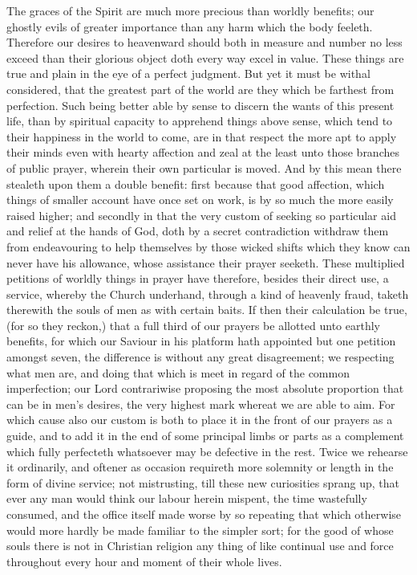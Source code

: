 The graces of the Spirit are much more precious than worldly benefits; our ghostly evils of greater importance than any harm which the body feeleth. Therefore our desires to heavenward should both in measure and number no less exceed than their glorious object doth every way excel in value. These things are true and plain in the eye of a perfect judgment. But yet it must be withal considered, that the greatest part of the world are they which be farthest from perfection. Such being better able by sense to discern the wants of this present life, than by spiritual capacity to apprehend things above sense, which tend to their happiness in the world to come, are in that respect the more apt to apply their minds even with hearty affection and zeal at the least unto those branches of public prayer, wherein their own particular is moved. And by this mean there stealeth upon them a double benefit: first because that good affection, which things of smaller account have once set on work, is by so much the more easily raised higher; and secondly in that the very  custom of seeking so particular aid and relief at the hands of God, doth by a secret contradiction withdraw them from endeavouring to help themselves by those wicked shifts which they know can never have his allowance, whose assistance their prayer seeketh. These multiplied petitions of worldly things in prayer have therefore, besides their direct use, a service, whereby the Church underhand, through a kind of heavenly fraud, taketh therewith the souls of men as with certain baits.
If then their calculation be true, (for so they reckon,) that a full third of our prayers be allotted unto earthly benefits, for which our Saviour in his platform hath appointed but one petition amongst seven, the difference is without any great disagreement; we respecting what men are, and doing that which is meet in regard of the common imperfection; our Lord contrariwise proposing the most absolute proportion that can be in men’s desires, the very highest mark whereat we are able to aim.
For which cause also our custom is both to place it in the front of our prayers as a guide, and to add it in the end of some principal limbs or parts as a complement which fully perfecteth whatsoever may be defective in the rest. Twice we rehearse it ordinarily, and oftener as occasion requireth more solemnity or length in the form of divine service; not mistrusting, till these new curiosities sprang up, that ever any man would think our labour herein mispent, the time wastefully consumed, and the office itself made worse by so repeating that which otherwise would more hardly be made familiar to the simpler sort; for the good of whose souls there is not  in Christian religion any thing of like continual use and force throughout every hour and moment of their whole lives.
